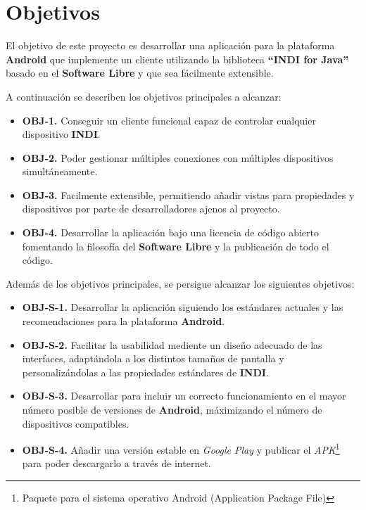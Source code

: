 \chapter{Objetivos}

El objetivo de este proyecto es desarrollar una aplicación para la plataforma \textbf{Android} que implemente un cliente utilizando la  biblioteca \textbf{``INDI for Java''} basado en el \textbf{Software Libre} y que sea fácilmente extensible.

\bigskip
A continuación se describen los objetivos principales a alcanzar:

\begin{itemize}
  \item \textbf{OBJ-1.} Conseguir un cliente funcional capaz de controlar cualquier dispositivo \textbf{INDI}.
  \item \textbf{OBJ-2.} Poder gestionar múltiples conexiones con múltiples dispositivos simultáneamente.
  \item \textbf{OBJ-3.} Facilmente extensible, permitiendo añadir vistas para propiedades y  dispositivos por parte de desarrolladores ajenos al proyecto.
  \item \textbf{OBJ-4.} Desarrollar la aplicación bajo una licencia de código abierto fomentando la filosofía del \textbf{Software Libre} y la publicación de todo el código.
\end{itemize}

\bigskip
Además de los objetivos principales, se persigue alcanzar los siguientes objetivos:

\begin{itemize}
  \item \textbf{OBJ-S-1.} Desarrollar la aplicación siguiendo los estándares actuales y las recomendaciones para la plataforma \textbf{Android}.
  \item \textbf{OBJ-S-2.} Facilitar la usabilidad mediente un diseño adecuado de las interfaces, adaptándola a los distintos tamaños de pantalla y personalizándolas a las propiedades estándares de \textbf{INDI}.
  \item \textbf{OBJ-S-3.} Desarrollar para incluir un correcto funcionamiento en el mayor número posible de versiones de \textbf{Android}, máximizando el número de dispositivos compatibles.
  \item \textbf{OBJ-S-4.} Añadir una versión estable en \textit{Google Play} y publicar el \textit{APK}\footnote{Paquete para el sistema operativo Android (Application Package File)} para poder descargarlo a través de internet.
\end{itemize}

